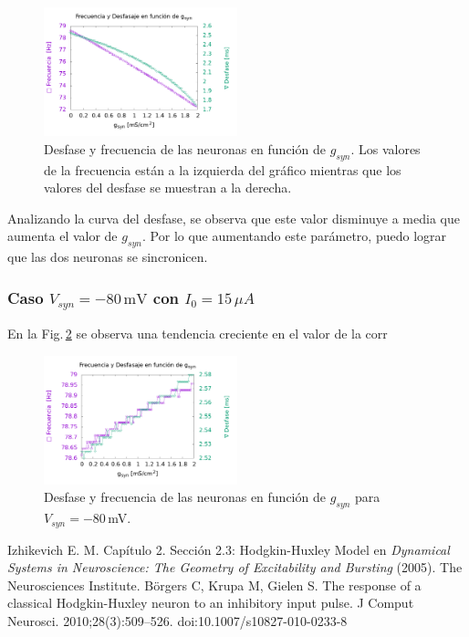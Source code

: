         \begin{figure}[H]
            \centering
            \includegraphics[width=0.5\textwidth]{../Graficos/current_15.png}
            \caption{Desfase y frecuencia de las neuronas en función de $g_{syn}$. Los valores de la frecuencia están a la izquierda del gráfico mientras que los valores del desfase se muestran a la derecha.}
            \label{fig:des_fre}
        \end{figure}  

    Analizando la curva del desfase, se observa que este valor disminuye a media que aumenta el valor de $g_{syn}$. Por lo que aumentando este parámetro, puedo lograr que las dos neuronas se sincronicen. 
  
    \subsubsection{Caso \texorpdfstring{$V_{syn}= -80\,\text{mV}$}{}   con  \texorpdfstring{$I_0 = 15\,\mu A$}{}}

    En la Fig.\,\ref{fig:des_fre_in} se observa una tendencia creciente en el valor de la corr


    \begin{figure}[H]
            \centering
            \includegraphics[width=0.5\textwidth]{../Graficos/current_15_in.png}
            \caption{Desfase y frecuencia de las neuronas en función de $g_{syn}$ para $V_{syn}=-80\,$mV.}
            \label{fig:des_fre_in}
        \end{figure}



\begin{thebibliography}{50}
{} Izhikevich E. M. Capítulo 2. Sección 2.3: Hodgkin-Huxley Model en {\sl Dynamical Systems in Neuroscience: The Geometry of Excitability and Bursting} (2005).  The Neurosciences Institute.
 Börgers C, Krupa M, Gielen S. The response of a classical Hodgkin-Huxley neuron to an inhibitory input pulse. J Comput Neurosci. 2010;28(3):509–526. doi:10.1007/s10827-010-0233-8
\end{thebibliography}

